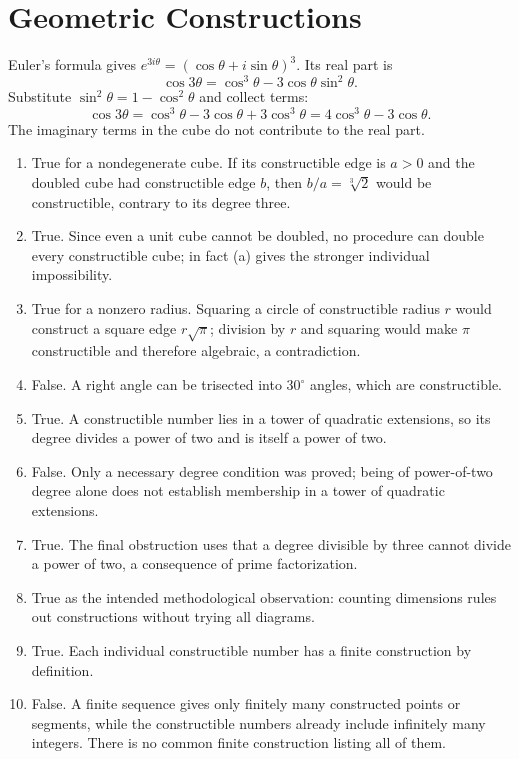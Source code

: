 \section{Geometric Constructions}

Euler's formula gives $e^{3i\theta}=(\cos\theta+i\sin\theta)^3$. Its real part is
\[\cos3\theta=\cos^3\theta-3\cos\theta\sin^2\theta.\]
Substitute $\sin^2\theta=1-\cos^2\theta$ and collect terms:
\[\cos3\theta=\cos^3\theta-3\cos\theta+3\cos^3\theta=4\cos^3\theta-3\cos\theta.\]
The imaginary terms in the cube do not contribute to the real part.

\begin{enumerate}[label=(\alph*)]
\item True for a nondegenerate cube. If its constructible edge is $a>0$ and the doubled cube had constructible edge $b$, then $b/a=\sqrt[3]2$ would be constructible, contrary to its degree three.
\item True. Since even a unit cube cannot be doubled, no procedure can double every constructible cube; in fact (a) gives the stronger individual impossibility.
\item True for a nonzero radius. Squaring a circle of constructible radius $r$ would construct a square edge $r\sqrt\pi$; division by $r$ and squaring would make $\pi$ constructible and therefore algebraic, a contradiction.
\item False. A right angle can be trisected into $30^\circ$ angles, which are constructible.
\item True. A constructible number lies in a tower of quadratic extensions, so its degree divides a power of two and is itself a power of two.
\item False. Only a necessary degree condition was proved; being of power-of-two degree alone does not establish membership in a tower of quadratic extensions.
\item True. The final obstruction uses that a degree divisible by three cannot divide a power of two, a consequence of prime factorization.
\item True as the intended methodological observation: counting dimensions rules out constructions without trying all diagrams.
\item True. Each individual constructible number has a finite construction by definition.
\item False. A finite sequence gives only finitely many constructed points or segments, while the constructible numbers already include infinitely many integers. There is no common finite construction listing all of them.
\end{enumerate}

